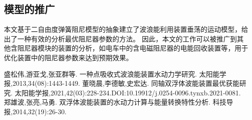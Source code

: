\documentclass[withoutpreface,bwprint]{cumcmthesis} %
\begin{document}
    \subsection{模型的推广}
    本文基于二自由度弹簧阻尼模型的抽象建立了波浪能利用装置垂荡的运动模型，给出了一种有效的分析最优阻尼器参数的方法。
    因此，本文的工作可以被推广到其他含阻尼器模块的装置的分析，如电车中的含电磁阻尼器的电能回收装置等，用于优化装置中的阻尼器参数来达到预期效果。
    \newpage
    \begin{thebibliography}{9}%
        盛松伟,游亚戈,张亚群等.
        \newblock 一种点吸收式波浪能装置水动力学研究\allowbreak[J].
        \newblock 太阳能学报,2013,34(08):1443-1449.
        董晓晨,李德敏,史宏达.
        \newblock 同轴双浮体波能装置最优获能研究\allowbreak[J].
        \newblock 太阳能学报,2021,42(03):228-234.DOI:10.19912/j.0254-0096.tynxb.2021-0081.
        郑雄波,张亮,马勇.
        \newblock 双浮体波能装置的水动力计算与能量转换特性分析\allowbreak[J].
        \newblock 科技导报,2014,32(19):26-30.
    \end{thebibliography}
\end{document}
